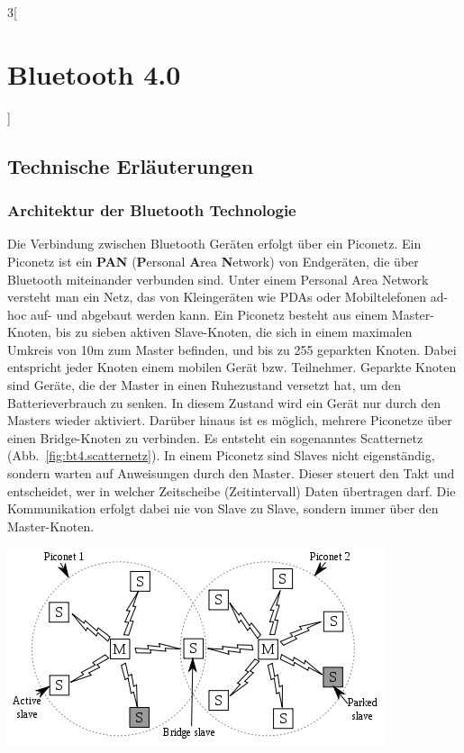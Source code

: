 \begin{multicols}{3}[\section{Bluetooth 4.0}]
\subsection*{Technische Erläuterungen}
\subsubsection*{Architektur der Bluetooth Technologie}
Die Verbindung zwischen Bluetooth Geräten erfolgt über ein Piconetz. Ein Piconetz ist ein \textbf{PAN} (\textbf{P}ersonal \textbf{A}rea \textbf{N}etwork) von Endgeräten, die über Bluetooth miteinander verbunden sind. Unter einem Personal Area Network versteht man ein Netz, das von Kleingeräten wie PDAs oder Mobiltelefonen ad-hoc auf- und abgebaut werden kann. 
Ein Piconetz besteht aus einem Master-Knoten, bis zu sieben aktiven Slave-Knoten, die sich in einem maximalen Umkreis von 10m zum Master befinden, und bis zu 255 geparkten Knoten. Dabei entspricht jeder Knoten einem mobilen Gerät bzw. Teilnehmer. Geparkte Knoten sind Geräte, die der Master in einen Ruhezustand versetzt hat, um den Batterieverbrauch zu senken. In diesem Zustand wird ein Gerät nur durch den Masters wieder aktiviert. Darüber hinaus ist es möglich, mehrere Piconetze über einen Bridge-Knoten zu verbinden. Es entsteht ein sogenanntes Scatternetz (Abb.~\ref{fig:bt4.scatternetz}). In einem Piconetz sind Slaves nicht eigenständig, sondern warten auf Anweisungen durch den Master. Dieser steuert den Takt und entscheidet, wer in welcher Zeitscheibe (Zeitintervall) Daten übertragen darf. Die Kommunikation erfolgt dabei nie von Slave zu Slave, sondern  immer über den Master-Knoten.~\cite{Bluetooth_4.2}

\begin{Figure}
\includegraphics[width=\linewidth]{Kapitel/Bluetooth_4/Grafiken/piconetz.png}
\label{fig:bt4.scatternetz}
\end{Figure}


\end{multicols}
